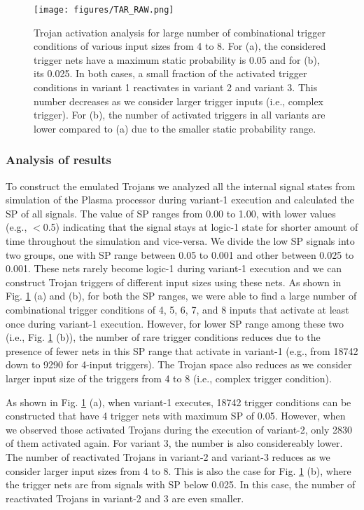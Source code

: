 \documentclass[conference]{IEEEtran}
\begin{document}
\begin{figure}[t!]
\centerline{\texttt{[image: figures/TAR\_RAW.png]}}
\caption{Trojan activation analysis for large number of combinational trigger conditions of various input sizes from 4 to 8. For (a), the considered trigger nets have a maximum static probability is 0.05 and for (b), its 0.025. In both cases, a small fraction of the activated trigger conditions in variant 1 reactivates in variant 2 and variant 3. This number decreases as we consider larger trigger inputs (i.e., complex trigger). For (b), the number of activated triggers in all variants are lower compared to (a) due to the smaller static probability range. }
\label{fig:lfsr1}
\end{figure}

\subsubsection{Analysis of results}
To construct the emulated Trojans we analyzed all the internal signal states from simulation of the Plasma processor during variant-1 execution and calculated the SP of all signals.  
The value of SP ranges from 0.00 to 1.00, with lower values (e.g., $<$0.5) indicating that the signal stays at logic-1 state for shorter amount of time throughout the simulation and vice-versa. 
We divide the low SP signals into two groups, one with SP range between 0.05 to 0.001 and other between 0.025 to 0.001. These nets rarely become logic-1 during variant-1 execution and we can construct Trojan triggers of different input sizes using these nets. 
As shown in Fig. \ref{fig:lfsr1} (a) and (b), for both the SP ranges, we were able to find a large number of combinational trigger conditions of 4, 5, 6, 7, and 8 inputs that activate at least once during variant-1 execution. However, for lower SP range among these two (i.e., Fig. \ref{fig:lfsr1} (b)), the number of rare trigger conditions reduces due to the presence of fewer nets in this SP range that activate in variant-1 (e.g., from 18742 down to 9290 for 4-input triggers). The Trojan space also reduces as we consider larger input size of the triggers from 4 to 8 (i.e., complex trigger condition). 


As shown in Fig. \ref{fig:lfsr1} (a), when variant-1 executes, 18742 trigger conditions can be constructed that have 4 trigger nets with  maximum SP of 0.05. However, when we observed those activated Trojans during the execution of variant-2, only 2830 of them activated again. For variant 3, the number is also considereably lower. The number of reactivated Trojans in variant-2 and variant-3 reduces as we consider larger input sizes from 4 to 8. This is also the case for Fig. \ref{fig:lfsr1} (b), where the trigger nets are from signals with SP below 0.025. In this case, the number of reactivated Trojans in variant-2 and 3 are even smaller. 
\end{document}
